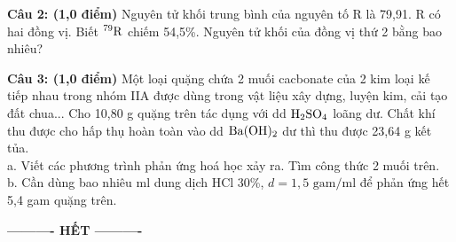 \documentclass[11pt,a4paper]{article}
\begin{document}
\vspace{1pt}
\noindent
{}

\vspace{4pt}
\noindent
\textbf{Câu 2: (1,0 điểm)} Nguyên tử khối trung bình của nguyên tố R là 79,91. R có hai đồng vị. Biết $^{79}\ce{R}$ chiếm 54,5\%. Nguyên tử khối của đồng vị thứ 2 bằng bao nhiêu?

\vspace{1pt}
\noindent
{}

\vspace{4pt}
\noindent
\textbf{Câu 3: (1,0 điểm)} Một loại quặng chứa 2 muối cacbonate của 2 kim loại kế tiếp nhau trong nhóm IIA được dùng trong vật liệu xây dựng, luyện kim, cải tạo đất chua... Cho 10,80 g quặng trên tác dụng với dd $\ce{H2SO4}$ loãng dư. Chất khí thu được cho hấp thụ hoàn toàn vào dd $\ce{Ba(OH)2}$ dư thì thu được 23,64 g kết tủa.\\
a. Viết các phương trình phản ứng hoá học xảy ra. Tìm công thức 2 muối trên.\\
b. Cần dùng bao nhiêu ml dung dịch HCl 30\%, $d = 1,5\text{ gam/ml}$ để phản ứng hết 5,4 gam quặng trên.

\vspace{1pt}
\noindent
{}

\vspace{6pt}
\begin{center}
\textbf{\large ---------- HẾT ----------}
\end{center}
\end{document}
